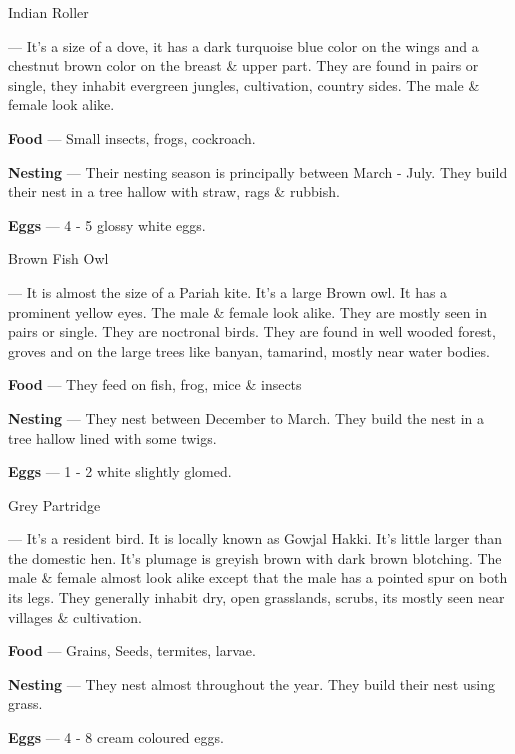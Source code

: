 \begin{bird}{Indian Roller}

 --- It's a size of a dove, it has a dark turquoise blue color on the wings and a chestnut brown color on the breast \& upper part. They are found in pairs or single, they inhabit evergreen jungles, cultivation, country sides. The male \& female look alike. 

{\large\bf Food} --- Small insects, frogs, cockroach.

{\large\bf Nesting} --- Their nesting season is principally between March - July. They build their nest in a tree hallow with straw, rags \& rubbish.

{\large\bf Eggs} --- 4 - 5 glossy white eggs. 
\end{bird}

\begin{bird}{Brown Fish Owl}

 --- It is almost the size of a Pariah kite. It's a large Brown owl. It has a prominent yellow eyes. The male \& female look alike. They are mostly seen in pairs or single. They are noctronal birds. They are found in well wooded  forest, groves and on the large trees like banyan, tamarind, mostly near water bodies.

{\large\bf Food} --- They feed on fish, frog, mice \& insects

{\large\bf Nesting} --- They nest between December to March. They build the nest in a tree hallow lined with some twigs.

{\large\bf Eggs} --- 1 - 2 white slightly glomed.
\end{bird}

\begin{bird}{Grey Partridge}

 --- It's a resident bird. It is locally known as Gowjal Hakki. It's little larger than the domestic hen. It's plumage is greyish brown with dark brown blotching. The male \& female almost look alike except that the male has a pointed spur on both its legs. They generally inhabit dry, open grasslands, scrubs, its mostly seen near villages \& cultivation.

{\large\bf Food} --- Grains, Seeds, termites, larvae.

{\large\bf Nesting} --- They nest almost throughout the year. They build their nest using grass.

{\large\bf Eggs} --- 4 - 8 cream coloured eggs.
\end{bird}

